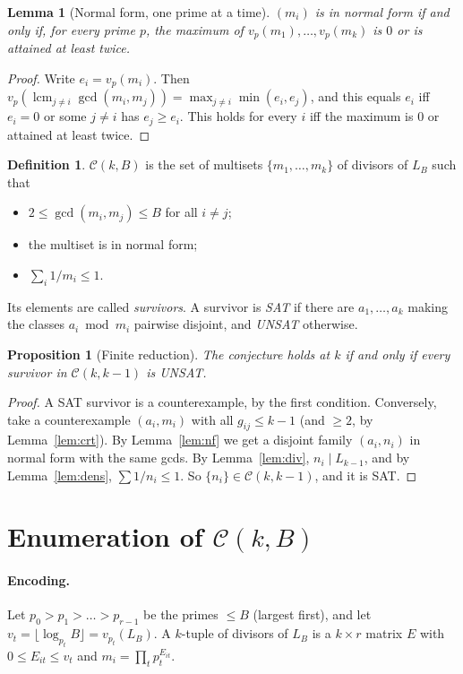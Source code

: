 \documentclass[11pt]{article}
\newtheorem{lemma}[theorem]{Lemma}
\newtheorem{proposition}[theorem]{Proposition}
\theoremstyle{definition}
\newtheorem{definition}[theorem]{Definition}
\theoremstyle{remark}
\newcommand{\C}{\mathcal{C}}
\begin{document}
\begin{lemma}[Normal form, one prime at a time]\label{lem:nfp}
$(m_i)$ is in normal form if and only if, for every prime $p$, the maximum of
$v_p(m_1),\dots,v_p(m_k)$ is $0$ or is attained at least twice.
\end{lemma}
\begin{proof}
Write $e_i=v_p(m_i)$. Then $v_p(\operatorname{lcm}_{j\ne i}\gcd(m_i,m_j))=\max_{j\ne i}\min(e_i,e_j)$, and
this equals $e_i$ iff $e_i=0$ or some $j\ne i$ has $e_j\ge e_i$. This holds for every $i$ iff the
maximum is $0$ or attained at least twice.
\end{proof}

\begin{definition}
$\C(k,B)$ is the set of multisets $\{m_1,\dots,m_k\}$ of divisors of $L_B$ such that
\begin{itemize}
\item $2\le\gcd(m_i,m_j)\le B$ for all $i\ne j$;
\item the multiset is in normal form;
\item $\sum_i1/m_i\le1$.
\end{itemize}
Its elements are called \emph{survivors}. A survivor is \emph{SAT} if there are
$a_1,\dots,a_k$ making the classes $a_i\bmod m_i$ pairwise disjoint, and \emph{UNSAT} otherwise.
\end{definition}

\begin{proposition}[Finite reduction]\label{prop:finite}
The conjecture holds at $k$ if and only if every survivor in $\C(k,k-1)$ is UNSAT.
\end{proposition}
\begin{proof}
A SAT survivor is a counterexample, by the first condition. Conversely, take a counterexample
$(a_i,m_i)$ with all $g_{ij}\le k-1$ (and $\ge2$, by Lemma~\ref{lem:crt}). By
Lemma~\ref{lem:nf} we get a disjoint family $(a_i,n_i)$ in normal form with the same gcds. By
Lemma~\ref{lem:div}, $n_i\mid L_{k-1}$, and by Lemma~\ref{lem:dens}, $\sum 1/n_i\le1$. So
$\{n_i\}\in\C(k,k-1)$, and it is SAT.
\end{proof}

\section{Enumeration of $\C(k,B)$}\label{sec:enum}

\paragraph{Encoding.}
Let $p_0>p_1>\dots>p_{r-1}$ be the primes $\le B$ (largest first), and let
$v_t=\lfloor\log_{p_t}B\rfloor=v_{p_t}(L_B)$. A $k$-tuple of divisors of $L_B$ is a $k\times r$
matrix $E$ with $0\le E_{it}\le v_t$ and $m_i=\prod_tp_t^{E_{it}}$.
\end{document}
